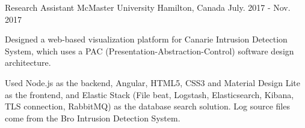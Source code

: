 \begin{cventries}
  \cventry
{Research Assistant} %
{McMaster University} %
{Hamilton, Canada} %
{July. 2017 - Nov. 2017} %
{\begin{cvitems}
		\item
		{Designed a web-based visualization platform for Canarie Intrusion Detection System, which uses a PAC (Presentation-Abstraction-Control) software design architecture.}
		\item
		{Used Node.js as the backend, Angular, HTML5, CSS3 and Material Design Lite as the frontend, and Elastic Stack (File beat, Logstash, Elasticsearch, Kibana, TLS connection, RabbitMQ) as the database search solution. Log source files come from the Bro Intrusion Detection System.}
	\end{cvitems}
}


\end{cventries}
